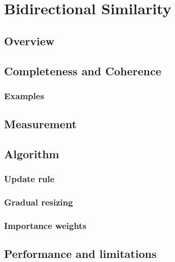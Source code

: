 \section{Bidirectional Similarity}
\subsection{Overview}
\subsection{Completeness and Coherence}
\subsubsection{Examples}
\subsection{Measurement}
\subsection{Algorithm}
\subsubsection{Update rule}
\subsubsection{Gradual resizing}
\subsubsection{Importance weights}
\subsection{Performance and limitations}